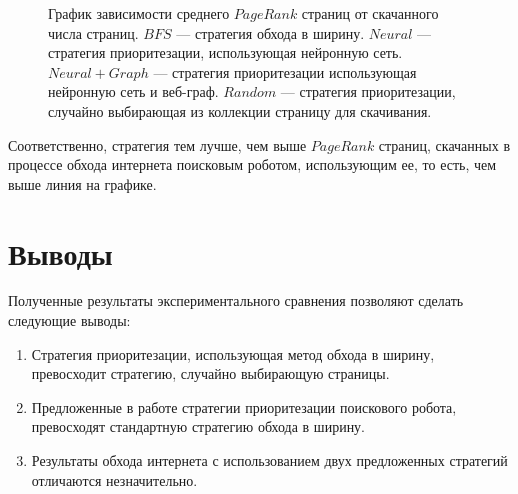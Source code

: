 \begin{figure}[h!]
\caption{График зависимости среднего $PageRank$ страниц от скачанного числа страниц. $BFS$ --- стратегия обхода в ширину. $Neural$ --- стратегия приоритезации, использующая нейронную сеть. $Neural + Graph$ --- стратегия приоритезации использующая нейронную сеть и веб-граф. $Random$ --- стратегия приоритезации, случайно выбирающая из коллекции страницу для скачивания.}
\label{graphic}
\end{figure}

Соответственно, стратегия тем лучше, чем выше $PageRank$ страниц, скачанных в процессе обхода интернета поисковым роботом, использующим ее, то есть, чем выше линия на графике.

\section{Выводы}

Полученные результаты экспериментального сравнения позволяют сделать следующие выводы:

\begin{enumerate}
\item Стратегия приоритезации, использующая метод обхода в ширину, превосходит стратегию, случайно выбирающую страницы.
\item Предложенные в работе стратегии приоритезации поискового робота, превосходят стандартную стратегию обхода в ширину.
\item Результаты обхода интернета с использованием двух предложенных стратегий отличаются незначительно.
\end{enumerate}

